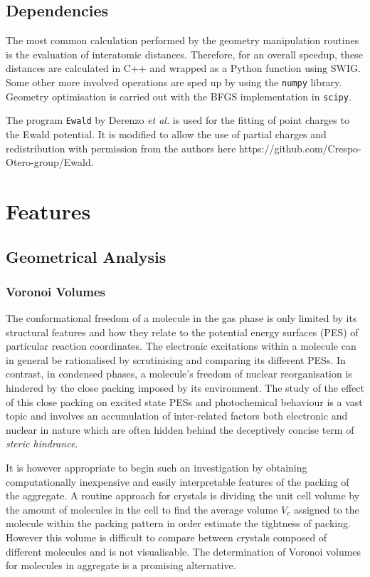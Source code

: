 \subsection{Dependencies}

The most common calculation performed by the geometry manipulation routines is the evaluation of interatomic distances. Therefore, for an overall speedup, these distances are calculated in C++ and wrapped as a Python function using SWIG. Some other more involved operations are sped up by using the \texttt{numpy}\cite{numpy} library. Geometry optimisation is carried out with the BFGS implementation in \texttt{scipy}.\cite{scipy}

The program \texttt{Ewald} by Derenzo \textit{et al.}\cite{Derenzo2000,Klintenberg2000} is used for the fitting of point charges to the Ewald potential. It is modified to allow the use of partial charges and redistribution with permission from the authors here https://github.com/Crespo-Otero-group/Ewald.

\section{Features}
\label{sec:features}
\subsection{Geometrical Analysis}
\subsubsection{Voronoi Volumes}
\label{sec:vor}

The conformational freedom of a molecule in the gas phase is only limited by its structural features and how they relate to the potential energy surfaces  (PES) of particular reaction coordinates. The electronic excitations within a molecule can in general be rationalised by scrutinising and comparing its different PESs. In contrast, in condensed phases, a molecule's freedom of nuclear reorganisation is hindered by the close packing imposed by its environment. The study of the effect of this close packing on excited state PESs and photochemical behaviour is a vast topic and involves an accumulation of inter-related factors both electronic and nuclear in nature which are often hidden behind the deceptively concise term of \textit{steric hindrance}.\cite{Dommett2017c,Blancafort2018}

It is however appropriate to begin such an investigation by obtaining computationally inexpensive and easily interpretable features of the packing of the aggregate. A routine approach for crystals is dividing the unit cell volume by the amount of molecules in the cell to find the average volume $V_{c}$ assigned to the molecule within the packing pattern in order estimate the tightness of packing. However this volume is difficult to compare between crystals composed of different molecules and is not visualisable. The determination of Voronoi volumes for molecules in aggregate is a promising alternative.

